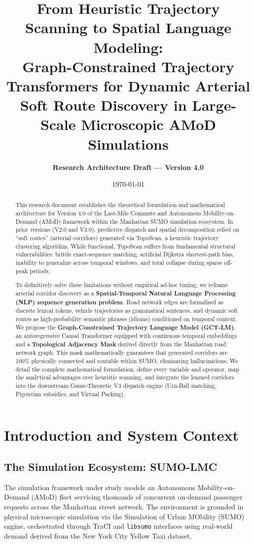 \documentclass[12pt,a4paper]{article}
\title{\textbf{From Heuristic Trajectory Scanning to Spatial Language Modeling: \\
Graph-Constrained Trajectory Transformers for Dynamic Arterial Soft Route Discovery in Large-Scale Microscopic AMoD Simulations}}
\author{\textbf{Research Architecture Draft --- Version 4.0}}
\date{\today}
\begin{document}
\maketitle

\begin{abstract}
This research document establishes the theoretical formulation and mathematical architecture for Version 4.0 of the Last-Mile Commute and Autonomous Mobility-on-Demand (AMoD) framework within the Manhattan SUMO simulation ecosystem. In prior versions (V2.0 and V3.0), predictive dispatch and spatial decomposition relied on ``soft routes'' (arterial corridors) generated via TopoScan, a heuristic trajectory clustering algorithm. While functional, TopoScan suffers from fundamental structural vulnerabilities: brittle exact-sequence matching, artificial Dijkstra shortest-path bias, inability to generalize across temporal windows, and total collapse during sparse off-peak periods.

To definitively solve these limitations without empirical ad-hoc tuning, we reframe arterial corridor discovery as a \textbf{Spatial-Temporal Natural Language Processing (NLP) sequence generation problem}. Road network edges are formalized as discrete lexical tokens, vehicle trajectories as grammatical sentences, and dynamic soft routes as high-probability semantic phrases (idioms) conditioned on temporal context. We propose the \textbf{Graph-Constrained Trajectory Language Model (GCT-LM)}, an autoregressive Causal Transformer equipped with continuous temporal embeddings and a \textbf{Topological Adjacency Mask} derived directly from the Manhattan road network graph. This mask mathematically guarantees that generated corridors are 100\% physically connected and routable within SUMO, eliminating hallucinations. We detail the complete mathematical formulation, define every variable and operator, map the analytical advantages over heuristic scanning, and integrate the learned corridors into the downstream Game-Theoretic V3 dispatch engine (Urn-Ball matching, Pigouvian subsidies, and Virtual Parking).
\end{abstract}

\newpage
\tableofcontents
\newpage

\section{Introduction and System Context}

\subsection{The Simulation Ecosystem: SUMO-LMC}
The simulation framework under study models an Autonomous Mobility-on-Demand (AMoD) fleet servicing thousands of concurrent on-demand passenger requests across the Manhattan street network. The environment is grounded in physical microscopic simulation via the Simulation of Urban MObility (SUMO) engine, orchestrated through TraCI and \texttt{libsumo} interfaces using real-world demand derived from the New York City Yellow Taxi dataset.
\end{document}

